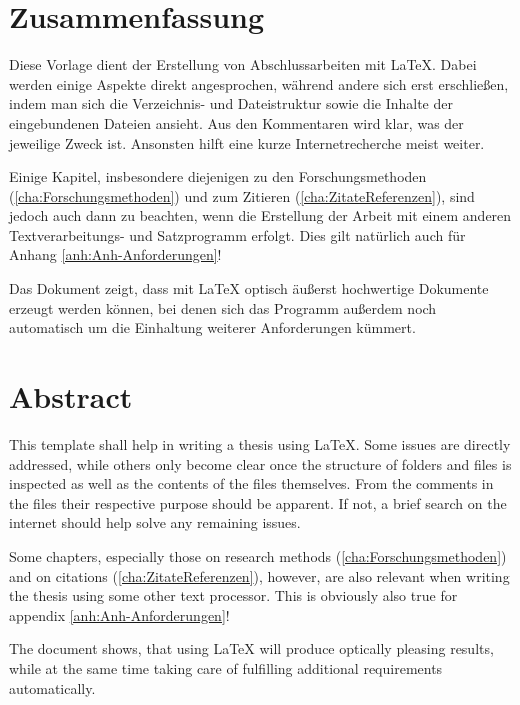 \section*{Zusammenfassung}
\label{sec:Zusammenfassung}
Diese Vorlage dient der Erstellung von Abschlussarbeiten mit \LaTeX.
Dabei werden einige Aspekte direkt angesprochen, während andere sich erst erschließen, indem man sich die Verzeichnis- und Dateistruktur sowie die Inhalte der eingebundenen Dateien ansieht. Aus den Kommentaren wird klar, was der jeweilige Zweck ist. Ansonsten hilft eine kurze Internetrecherche meist weiter.

Einige Kapitel, insbesondere diejenigen zu den Forschungsmethoden (\ref{cha:Forschungsmethoden}) und zum Zitieren
(\ref{cha:ZitateReferenzen}), sind jedoch auch dann zu beachten, wenn die Erstellung der Arbeit mit einem anderen
Textverarbeitungs- und Satzprogramm erfolgt. Dies gilt natürlich auch für Anhang \ref{anh:Anh-Anforderungen}!

Das Dokument zeigt, dass mit \LaTeX{} optisch äußerst hochwertige Dokumente erzeugt werden können, bei denen
sich das Programm außerdem noch automatisch um die Einhaltung weiterer Anforderungen kümmert.


\section*{Abstract}
\label{sec:Abstract}
This template shall help in writing a thesis using \LaTeX.
Some issues are directly addressed, while others only become clear once the structure of folders and files is inspected as well as the contents of the files themselves. From the comments in the files their respective purpose should be apparent. If not, a brief search on the internet should help solve any remaining issues.

Some chapters, especially those on research methods (\ref{cha:Forschungsmethoden}) and on citations
(\ref{cha:ZitateReferenzen}), however, are also relevant when writing the thesis using some other text
processor. This is obviously also true for appendix \ref{anh:Anh-Anforderungen}!

The document shows, that using \LaTeX{} will produce optically pleasing results, while at the same time taking
care of fulfilling additional requirements automatically.
